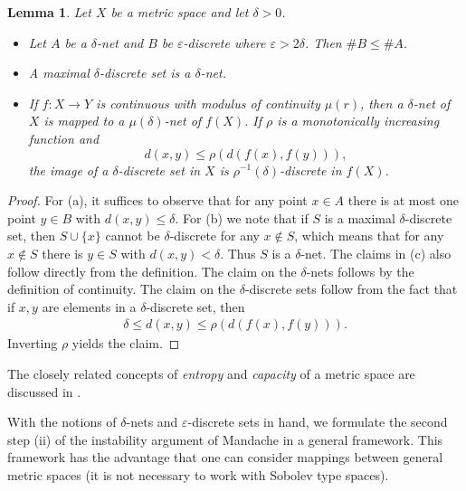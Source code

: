 \documentclass[12pt,twoside]{amsart}
\numberwithin{equation}{section}
\renewcommand{\le}{\leqslant}
\renewcommand{\leq}{\leqslant}
\newtheorem{lemma}[theorem]{Lemma}
\newcommand{\eps}{\varepsilon}
\begin{document}
\begin{lemma}
\label{lem:nets_discrete} 
Let $X$ be a metric space and let $\delta>0$.
\begin{itemize}
\item[(a)]  Let $A$ be a $\delta$-net and $B$ be $\eps$-discrete where $\eps > 2\delta$. Then
  $\#B \le \#A$.
\item[(b)]  A maximal $\delta$-discrete set is a $\delta$-net. 
\item[(c)]  If $ f : X \to Y$ is continuous with modulus of continuity $\mu(r)$, then a $\delta$-net of $X$ is mapped to a $\mu(\delta)$-net of $f(X)$. If $\rho$ is a monotonically increasing function and 
  \[ d(x,y) \le \rho( d(f(x),f(y))), \] 
  the image of a $\delta$-discrete set in $X$ is $\rho^{-1} (\delta)$-discrete in $f(X)$.
\end{itemize}
\end{lemma}  

\begin{proof}
For (a), it suffices to observe that for any point $x \in A$ there is at most one point $y \in B$ with $d(x,y) \leq \delta$. 
For (b) we
  note that if $S$ is a maximal $\delta$-discrete set, then $S \cup \{ x \}$ cannot be $\delta$-discrete for any $x \notin S$, which means that for any $x \notin S$ there is $y \in S$ with $d(x,y) < \delta$. Thus $S$ is a $\delta$-net.
  The claims in (c)
  also follow directly from the definition. The claim on the
  $\delta$-nets follows by the definition of continuity. The claim on
  the $\delta$-discrete sets follow from the fact that if $x,y$ are
  elements in a $\delta$-discrete set, then
\begin{align*}
\delta \leq d(x,y) \leq \rho(d(f(x),f(y))).
\end{align*}
Inverting $\rho$ yields the claim.
\end{proof}






The closely related concepts of \emph{entropy} and \emph{capacity} of a metric space are discussed in \cite{KolmogorovTikhomirov, ET08}.





With the notions of $\delta$-nets and $\eps$-discrete sets in hand, we formulate the second step (ii) of the instability argument of Mandache \cite{Mandache} in a general framework. This framework has the advantage that one can consider mappings between general metric spaces (it is not necessary to work with Sobolev type spaces).
\end{document}
